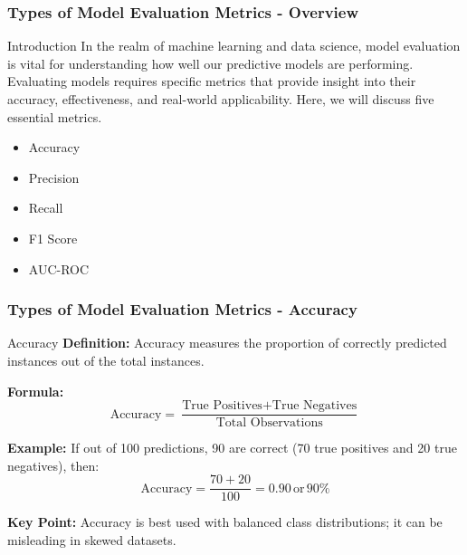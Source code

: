 \documentclass[aspectratio=169]{beamer}
\begin{document}
\begin{frame}[fragile]
    \frametitle{Types of Model Evaluation Metrics - Overview}
    \begin{block}{Introduction}
        In the realm of machine learning and data science, model evaluation is vital for understanding how well our predictive models are performing. 
        Evaluating models requires specific metrics that provide insight into their accuracy, effectiveness, and real-world applicability. 
        Here, we will discuss five essential metrics.
    \end{block}
    \begin{itemize}
        \item Accuracy
        \item Precision
        \item Recall
        \item F1 Score
        \item AUC-ROC
    \end{itemize}
\end{frame}

\begin{frame}[fragile]
    \frametitle{Types of Model Evaluation Metrics - Accuracy}
    \begin{block}{Accuracy}
        \textbf{Definition:} Accuracy measures the proportion of correctly predicted instances out of the total instances.
        
        \textbf{Formula:}
        \begin{equation}
            \text{Accuracy} = \frac{\text{True Positives} + \text{True Negatives}}{\text{Total Observations}}
        \end{equation}
        
        \textbf{Example:} If out of 100 predictions, 90 are correct (70 true positives and 20 true negatives), then:
        \begin{equation}
            \text{Accuracy} = \frac{70 + 20}{100} = 0.90 \, \text{or} \, 90\%
        \end{equation}
        
        \textbf{Key Point:} Accuracy is best used with balanced class distributions; it can be misleading in skewed datasets.
    \end{block}
\end{frame}
\end{document}
